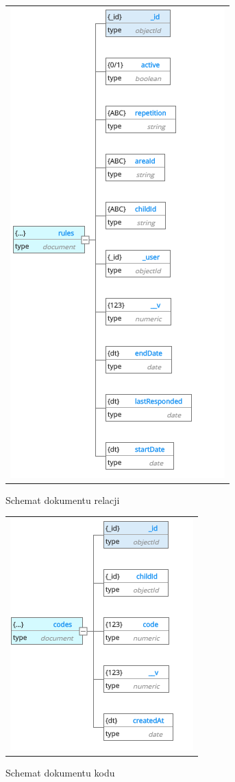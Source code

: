 \documentclass{sprawozdanie-agh}
\begin{document}
			\begin{figure}[H] 
				\centering 
				\begin{tabular}{c}
					\includegraphics[]{rules.png} 
				\end{tabular} 
				\caption{Schemat dokumentu relacji}
			\end{figure}

			\begin{figure}[H] 
				\centering 
				\begin{tabular}{c}
					\includegraphics[]{codes.png} 
				\end{tabular} 
				\caption{Schemat dokumentu kodu}
			\end{figure}
\end{document}
